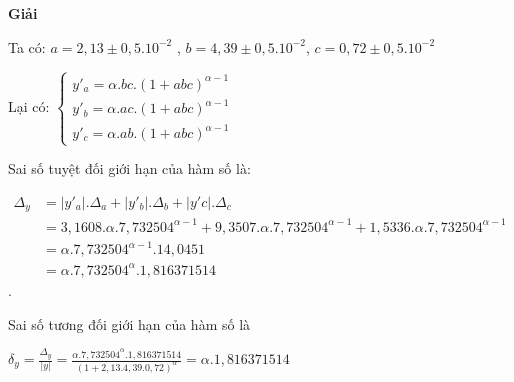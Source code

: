 \textbf{Giải}\par
Ta có: $a=2,13\pm 0,5.10^{-2}$ , $b=4,39\pm 0,5.10^{-2}$, $c=0,72\pm 0,5.10^{-2}$\par
Lại có: 
$\begin{cases}
	y'_a=\alpha.bc.(1+abc)^{\alpha-1}\\
	y'_b=\alpha.ac.(1+abc)^{\alpha-1}\\
	y'_c=\alpha.ab.(1+abc)^{\alpha-1}
\end{cases}$\par
Sai số tuyệt đối giới hạn của hàm số là:\par
$\begin{array}{ll}
	\Delta_y&=\left\lvert y'_a\right\rvert .\Delta_a+\left\lvert y'_b\right\rvert .\Delta_b+\left\lvert y'c\right\rvert . \Delta_c \\
	&=3,1608.\alpha .7,732504^{\alpha -1}  +9,3507.\alpha.7,732504^{\alpha -1}+ 1,5336.\alpha.7,732504^{\alpha -1}\\
	&=\alpha.7,732504^{\alpha -1}.14,0451\\
	&=\alpha.7,732504^{\alpha}.1,816371514
\end{array}$.\par
Sai số tương đối giới hạn của hàm số là\par
{\centering $\delta_y=\frac{\Delta_y}{|y|}=\frac{\alpha.7,732504^{\alpha}.1,816371514}{(1+2,13.4,39.0,72)^{\alpha}}=\alpha.1,816371514$\par}
